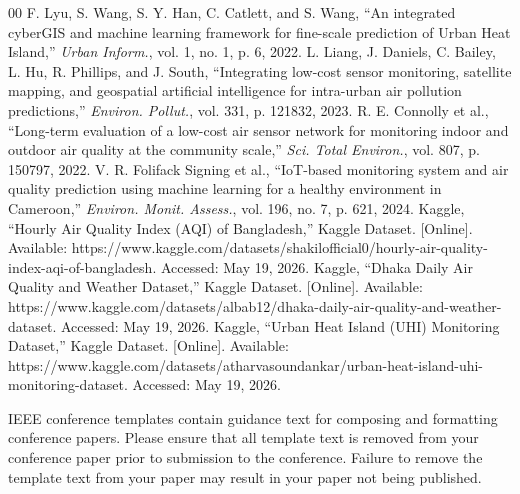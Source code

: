 \documentclass[conference]{IEEEtran}
\begin{document}
\begin{thebibliography}{00}
 F. Lyu, S. Wang, S. Y. Han, C. Catlett, and S. Wang, ``An integrated cyberGIS and machine learning framework for fine-scale prediction of Urban Heat Island,'' \textit{Urban Inform.}, vol. 1, no. 1, p. 6, 2022.
 L. Liang, J. Daniels, C. Bailey, L. Hu, R. Phillips, and J. South, ``Integrating low-cost sensor monitoring, satellite mapping, and geospatial artificial intelligence for intra-urban air pollution predictions,'' \textit{Environ. Pollut.}, vol. 331, p. 121832, 2023.
 R. E. Connolly et al., ``Long-term evaluation of a low-cost air sensor network for monitoring indoor and outdoor air quality at the community scale,'' \textit{Sci. Total Environ.}, vol. 807, p. 150797, 2022.
 V. R. Folifack Signing et al., ``IoT-based monitoring system and air quality prediction using machine learning for a healthy environment in Cameroon,'' \textit{Environ. Monit. Assess.}, vol. 196, no. 7, p. 621, 2024.
 Kaggle, ``Hourly Air Quality Index (AQI) of Bangladesh,'' Kaggle Dataset. [Online]. Available: https://www.kaggle.com/datasets/shakilofficial0/hourly-air-quality-index-aqi-of-bangladesh. Accessed: May 19, 2026.
 Kaggle, ``Dhaka Daily Air Quality and Weather Dataset,'' Kaggle Dataset. [Online]. Available: https://www.kaggle.com/datasets/albab12/dhaka-daily-air-quality-and-weather-dataset. Accessed: May 19, 2026.
 Kaggle, ``Urban Heat Island (UHI) Monitoring Dataset,'' Kaggle Dataset. [Online]. Available: https://www.kaggle.com/datasets/atharvasoundankar/urban-heat-island-uhi-monitoring-dataset. Accessed: May 19, 2026.
\end{thebibliography}

\vspace{12pt}
\color{red}
IEEE conference templates contain guidance text for composing and formatting conference papers. Please ensure that all template text is removed from your conference paper prior to submission to the conference. Failure to remove the template text from your paper may result in your paper not being published.
\end{document}
